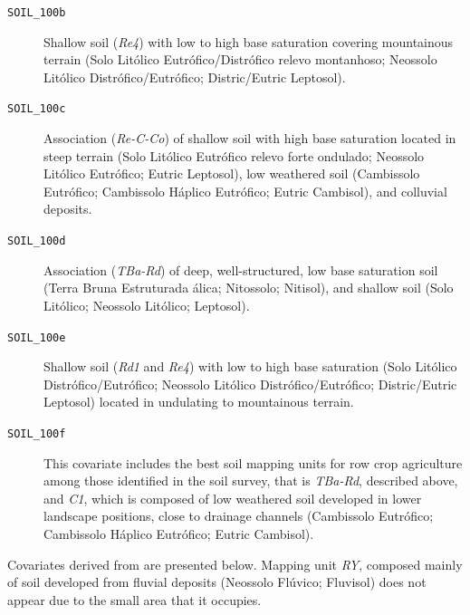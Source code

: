 \begin{description}
\item[\texttt{SOIL\_100b}] Shallow soil (\textit{Re4}) with low to high base saturation covering mountainous 
terrain (Solo Litólico Eutrófico/Distrófico relevo montanhoso; Neossolo Litólico Distrófico/Eutrófico;
Distric/Eutric Leptosol).
  
\item[\texttt{SOIL\_100c}] Association (\textit{Re-C-Co}) of shallow soil with high base saturation located in
steep terrain (Solo Litólico Eutrófico relevo forte ondulado; Neossolo Litólico Eutrófico; Eutric
Leptosol), low weathered soil (Cambissolo Eutrófico; Cambissolo Háplico Eutrófico; Eutric Cambisol), and
colluvial deposits.
  
\item[\texttt{SOIL\_100d}] Association (\textit{TBa-Rd}) of deep, well-structured, low base saturation soil 
(Terra Bruna Estruturada álica; Nitossolo; Nitisol), and shallow soil (Solo Litólico; Neossolo Litólico; 
Leptosol).
  
\item[\texttt{SOIL\_100e}] Shallow soil (\textit{Rd1} and \textit{Re4}) with low to high base
saturation (Solo Litólico Distrófico/Eutrófico; Neossolo Litólico Distrófico/Eutrófico; Distric/Eutric
Leptosol) located in undulating to mountainous terrain.
  
\item[\texttt{SOIL\_100f}] This covariate includes the best soil mapping units for row crop agriculture among 
those identified in the soil survey, that is \textit{TBa-Rd}, described above, and \textit{C1}, which is 
composed of low weathered soil developed in lower landscape positions, close to drainage channels (Cambissolo
Eutrófico; Cambissolo Háplico Eutrófico; Eutric Cambisol).
\end{description}

Covariates derived from \soilNew{} are presented below. Mapping unit \textit{RY}, composed mainly of soil 
developed from fluvial deposits (Neossolo Flúvico; Fluvisol) does not appear due to the small area that it 
occupies.

